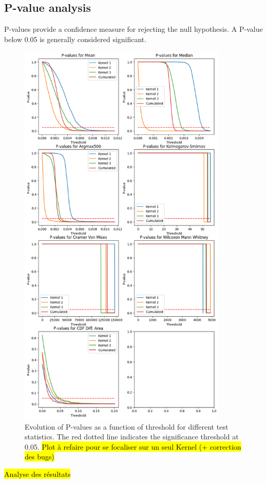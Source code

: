 \documentclass{article}
\begin{document}
\subsection{P-value analysis}

P-values provide a confidence measure for rejecting the null hypothesis. A P-value below 0.05 is generally considered significant.

\begin{figure}[H]
\centering
\includegraphics[width=10cm]{img/p-values.png}
\caption{Evolution of P-values as a function of threshold for different test statistics. The red dotted line indicates the significance threshold at 0.05. \hl{Plot à refaire pour se focaliser sur un seul Kernel (+ correction des bugs)}}
\label{fig:pvalues}
\end{figure}

\hl{Analyse des résultats}
\end{document}
